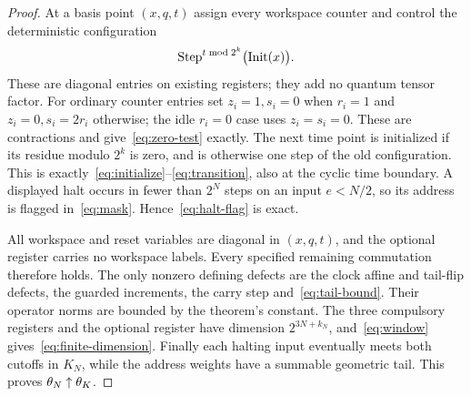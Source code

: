 \begin{proof}
At a basis point $(x,q,t)$ assign every workspace counter and control the deterministic configuration
\begin{equation}\label{eq:history}
 \operatorname{Step}^{t\bmod 2^k}\bigl(\operatorname{Init}(x)\bigr).
\end{equation}
These are diagonal entries on existing registers; they add no quantum tensor factor. For ordinary counter entries set $z_i=1,s_i=0$ when $r_i=1$ and $z_i=0,s_i=2r_i$ otherwise; the idle $r_i=0$ case uses $z_i=s_i=0$. These are contractions and give~\eqref{eq:zero-test} exactly. The next time point is initialized if its residue modulo $2^k$ is zero, and is otherwise one step of the old configuration. This is exactly~\eqref{eq:initialize}--\eqref{eq:transition}, also at the cyclic time boundary. A displayed halt occurs in fewer than $2^N$ steps on an input $e<N/2$, so its address is flagged in~\eqref{eq:mask}. Hence~\eqref{eq:halt-flag} is exact.

All workspace and reset variables are diagonal in $(x,q,t)$, and the optional register carries no workspace labels. Every specified remaining commutation therefore holds. The only nonzero defining defects are the clock affine and tail-flip defects, the guarded increments, the carry step and~\eqref{eq:tail-bound}. Their operator norms are bounded by the theorem's constant. The three compulsory registers and the optional register have dimension $2^{3N+k_N}$, and~\eqref{eq:window} gives~\eqref{eq:finite-dimension}. Finally each halting input eventually meets both cutoffs in $K_N$, while the address weights have a summable geometric tail. This proves $\theta_N\uparrow\theta_K$.
\end{proof}
